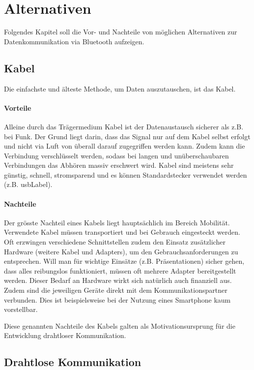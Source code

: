 \chapter{Alternativen}
\label{ch:alt}
Folgendes Kapitel soll die Vor- und Nachteile von möglichen Alternativen zur Datenkommunikation via Bluetooth aufzeigen.

\section{Kabel}
Die einfachste und älteste Methode, um Daten auszutauschen, ist das Kabel.

\subsubsection{Vorteile}
Alleine durch das Trägermedium Kabel ist der Datenaustausch sicherer als z.B. bei Funk. Der Grund liegt darin, dass das Signal nur auf dem Kabel selbst erfolgt und nicht via Luft von überall darauf zugegriffen werden kann.
Zudem kann die Verbindung verschlüsselt werden, sodass bei langen und unüberschaubaren Verbindungen das Abhören massiv erschwert wird.
Kabel sind meistens sehr günstig, schnell, stromsparend und es können Standardstecker verwendet werden (z.B. \gls{usbLabel}).

\subsubsection{Nachteile}
Der grösste Nachteil eines Kabels liegt hauptsächlich im Bereich Mobilität.
Verwendete Kabel müssen transportiert und bei Gebrauch eingesteckt werden.
Oft erzwingen verschiedene Schnittstellen zudem den Einsatz zusätzlicher Hardware (weitere Kabel und Adapters), um den Gebrauchsanforderungen zu entsprechen.
Will man für wichtige Einsätze (z.B. Präsentationen) sicher gehen, dass alles reibungslos funktioniert, müssen oft mehrere Adapter bereitgestellt werden.
Dieser Bedarf an Hardware wirkt sich natürlich auch finanziell aus.
Zudem sind  die jeweiligen Geräte direkt mit dem Kommunikationspartner verbunden.
Dies ist beispielsweise bei der Nutzung eines Smartphone kaum vorstellbar.

Diese genannten Nachteile des Kabels galten als Motivationsursprung für die Entwicklung drahtloser Kommunikation.

\section{Drahtlose Kommunikation}

